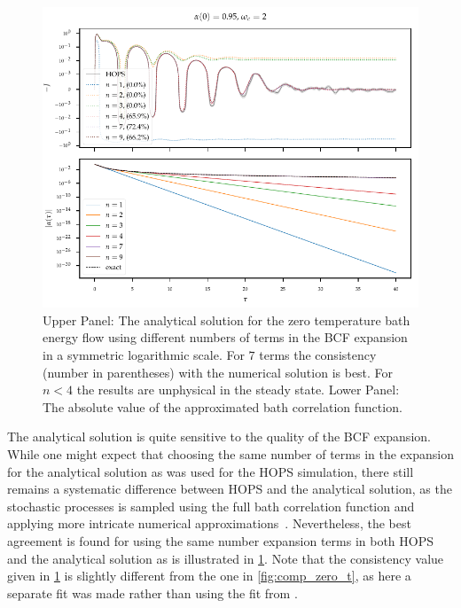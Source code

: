 \begin{figure}[h]
  \centering
  \includegraphics{figs/analytic_comp/analytical_terms_important.pdf}
  \caption{\label{fig:analytical_terms_important} Upper Panel: The
    analytical solution for the zero temperature bath energy flow
    using different numbers of terms in the BCF expansion in a
    symmetric logarithmic scale. For \(7\) terms the consistency
    (number in parentheses) with the numerical solution is best. For
    \(n<4\) the results are unphysical in the steady state.  Lower
    Panel: The absolute value of the approximated bath correlation
    function.}
\end{figure}

The analytical solution is quite sensitive to the quality of the BCF
expansion.  While one might expect that choosing the same number of
terms in the expansion for the analytical solution as was used for the
HOPS simulation, there still remains a systematic difference between
HOPS and the analytical solution, as the stochastic processes is
sampled using the full bath correlation function and applying more
intricate numerical approximations~\cite{RichardDiss}.  Nevertheless,
the best agreement is found for using the same number expansion terms
in both HOPS and the analytical solution as is illustrated in
\cref{fig:analytical_terms_important}. Note that the consistency value
given in \cref{fig:analytical_terms_important} is slightly different
from the one in \cref{fig:comp_zero_t}, as here a separate fit was
made rather than using the fit from \cite{RichardDiss}.

